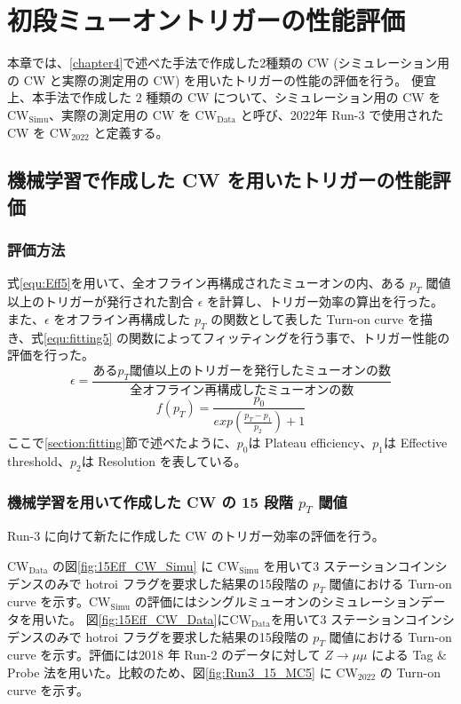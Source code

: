 \chapter{初段ミューオントリガーの性能評価}
本章では、\ref{chapter4}で述べた手法で作成した2種類の CW (シミュレーション用の CW と実際の測定用の CW) を用いたトリガーの性能の評価を行う。
便宜上、本手法で作成した 2 種類の CW について、シミュレーション用の CW を $\mathrm{CW_{Simu}}$、実際の測定用の CW を $\mathrm{CW_{Data}}$ と呼び、2022年 Run-3 で使用された CW を $\mathrm{CW_{2022}}$ と定義する。

\section{機械学習で作成した CW を用いたトリガーの性能評価}
\subsection{評価方法}
式\ref{equ:Eff5}を用いて、全オフライン再構成されたミューオンの内、ある $p_T$ 閾値以上のトリガーが発行された割合 $\epsilon$ を計算し、トリガー効率の算出を行った。また、$\epsilon$ をオフライン再構成した $p_T$ の関数として表した Turn-on curve を描き、式\eqref{equ:fitting5} の関数によってフィッティングを行う事で、トリガー性能の評価を行った。
\begin{equation}
　   \epsilon = \frac{ある p_T 閾値以上のトリガーを発行したミューオンの数}{全オフライン再構成したミューオンの数}
　\label{equ:Eff5}
\end{equation}
\begin{equation}
    f(p_T) = \frac{p_0}{exp(\frac{p_T-p_1}{p_2})+1}
　\label{equ:fitting5}
\end{equation}
ここで\ref{section:fitting}節で述べたように、$p_0$は Plateau efficiency、$p_1$は Effective threshold、$p_2$は Resolution を表している。

\subsection{機械学習を用いて作成した CW の 15 段階 $p_T$ 閾値}
Run-3 に向けて新たに作成した CW のトリガー効率の評価を行う。

$\mathrm{CW_{Data}}$ の図\ref{fig:15Eff_CW_Simu} に $\mathrm{CW_{Simu}}$ を用いて3 ステーションコインシデンスのみで hotroi フラグを要求した結果の15段階の $p_T$ 閾値における Turn-on curve を示す。$\mathrm{CW_{Simu}}$ の評価にはシングルミューオンのシミュレーションデータを用いた。
図\ref{fig:15Eff_CW_Data}に$\mathrm{CW_{Data}}$を用いて3 ステーションコインシデンスのみで hotroi フラグを要求した結果の15段階の $p_T$ 閾値における Turn-on curve を示す。評価には2018 年 Run-2 のデータに対して $Z \rightarrow \mu\mu$ による Tag $\&$ Probe 法を用いた。比較のため、図\ref{fig:Run3_15_MC5} に $\mathrm{CW_{2022}}$ の Turn-on curve を示す。

